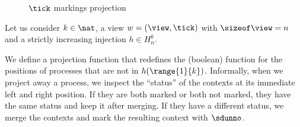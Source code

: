 \noindent%
\begin{wrapfigure}{r}{0.45\textwidth}
  \vspace{-24pt}
  \hfill
  \vspace{-6pt}
  \caption{$\tick$ markings projection}
  \label{figure:projection}
  \vspace{-12pt}
\end{wrapfigure}
%
Let us consider $k\in\nat$, a view $w = (\view,\tick)$ with $\sizeof
\view = n$ and a strictly increasing injection $h\in H_{n}^{k}$.

We define a projection function that redefines the (boolean) function
for the positions of processes that are not in $h(\range{1}{k})$. %
Informally, when we project away a process, we inspect the ``status''
of the contexts at its immediate left and right position. If they are
both marked or both not marked, they have the same status and keep it
after merging. If they have a different status, we merge the contexts
and mark the resulting context with $\sdunno$.
%
%
%


